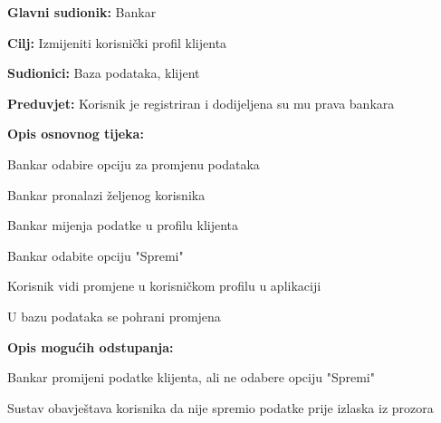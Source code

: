                 \noindent {}
                \begin{packed_item}
                
                  \item \textbf{Glavni sudionik: }Bankar
                  \item  \textbf{Cilj:} Izmijeniti korisnički profil klijenta 
                  \item  \textbf{Sudionici:} Baza podataka, klijent
                  \item  \textbf{Preduvjet:} Korisnik je registriran i dodijeljena su mu prava bankara
                  \item  \textbf{Opis osnovnog tijeka:}
                  
                  \item[] \begin{packed_enum}
                
                    \item  Bankar odabire opciju za promjenu podataka
                    \item  Bankar pronalazi željenog korisnika
                    \item  Bankar mijenja podatke u profilu klijenta
                    \item  Bankar odabite opciju "Spremi"
                    \item  Korisnik vidi promjene u korisničkom profilu u aplikaciji 
                    \item  U bazu podataka se pohrani promjena 
                  \end{packed_enum}
                  
                  \item  \textbf{Opis mogućih odstupanja:}
                  
                  \item[] \begin{packed_item}
                
                    \item[4.a] Bankar promijeni podatke klijenta, ali ne odabere opciju "Spremi" 
                    \item[] \begin{packed_enum}
                      
                      \item  Sustav obavještava korisnika da nije spremio podatke prije izlaska iz prozora
                      
                    \end{packed_enum}
                  
                \end{packed_item}
            \end{packed_item}
                
